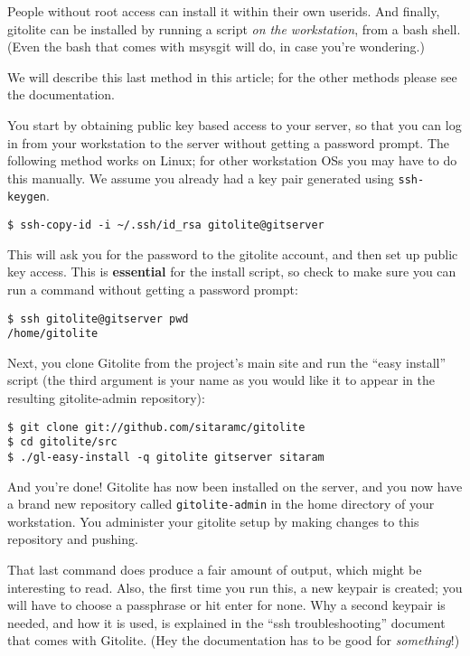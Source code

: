 \documentclass[a4paper]{book}
\begin{document}
People without root access can install it within their own userids. And finally, gitolite can be installed by running a script \emph{on the workstation}, from a bash shell. (Even the bash that comes with msysgit will do, in case you're wondering.)

We will describe this last method in this article; for the other methods please see the documentation.

You start by obtaining public key based access to your server, so that you can log in from your workstation to the server without getting a password prompt. The following method works on Linux; for other workstation OSs you may have to do this manually. We assume you already had a key pair generated using \texttt{ssh-keygen}.

\begin{shaded}\begin{verbatim}
$ ssh-copy-id -i ~/.ssh/id_rsa gitolite@gitserver
\end{verbatim}\end{shaded}

This will ask you for the password to the gitolite account, and then set up public key access. This is \textbf{essential} for the install script, so check to make sure you can run a command without getting a password prompt:

\begin{shaded}\begin{verbatim}
$ ssh gitolite@gitserver pwd
/home/gitolite
\end{verbatim}\end{shaded}

Next, you clone Gitolite from the project's main site and run the “easy install” script (the third argument is your name as you would like it to appear in the resulting gitolite-admin repository):

\begin{shaded}\begin{verbatim}
$ git clone git://github.com/sitaramc/gitolite
$ cd gitolite/src
$ ./gl-easy-install -q gitolite gitserver sitaram
\end{verbatim}\end{shaded}

And you're done! Gitolite has now been installed on the server, and you now have a brand new repository called \texttt{gitolite-admin} in the home directory of your workstation. You administer your gitolite setup by making changes to this repository and pushing.

That last command does produce a fair amount of output, which might be interesting to read. Also, the first time you run this, a new keypair is created; you will have to choose a passphrase or hit enter for none. Why a second keypair is needed, and how it is used, is explained in the “ssh troubleshooting” document that comes with Gitolite. (Hey the documentation has to be good for \emph{something}!)
\end{document}
